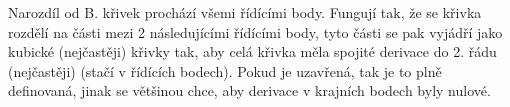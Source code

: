 \documentclass[12pt]{article}					%
\begin{document}
    \begin{definice}[Splines]
        Narozdíl od B. křivek prochází všemi řídícími body. Fungují tak, že se křivka rozdělí na části mezi 2 následujícími řídícími body, tyto části se pak vyjádří jako kubické (nejčastěji) křivky tak, aby celá křivka měla spojité derivace do 2. řádu (nejčastěji) (stačí v řídících bodech). Pokud je uzavřená, tak je to plně definovaná, jinak se většinou chce, aby derivace v krajních bodech byly nulové.
    \end{definice}
\end{document}
